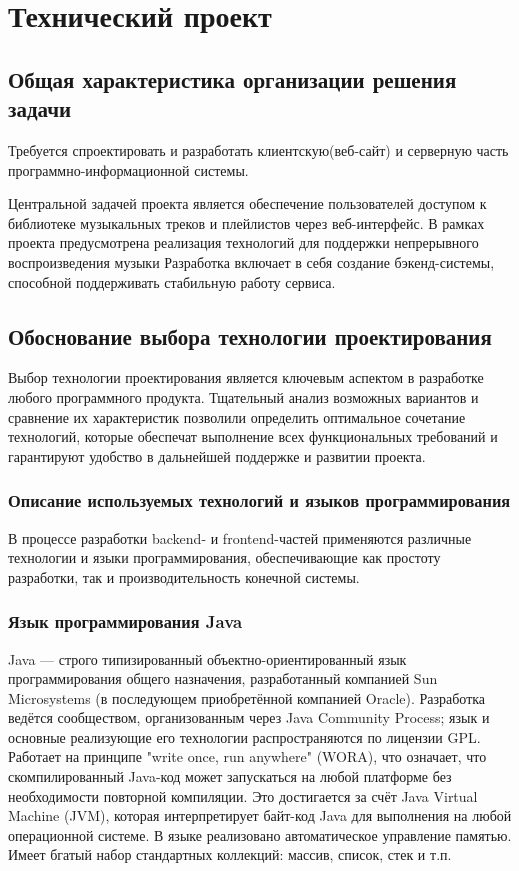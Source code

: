 \section{Технический проект}
\subsection{Общая характеристика организации решения задачи}

Требуется спроектировать и разработать клиентскую(веб-сайт) и серверную часть программно-информационной системы.

Центральной задачей проекта является обеспечение пользователей доступом к библиотеке музыкальных треков и плейлистов через веб-интерфейс. 
В рамках проекта предусмотрена реализация технологий для поддержки непрерывного воспроизведения музыки  Разработка включает в себя создание бэкенд-системы, способной поддерживать стабильную работу сервиса.

\subsection{Обоснование выбора технологии проектирования}

Выбор технологии проектирования является ключевым аспектом в разработке любого программного продукта. Тщательный анализ возможных вариантов и сравнение их характеристик позволили определить оптимальное сочетание технологий, которые обеспечат выполнение всех функциональных требований и гарантируют удобство в дальнейшей поддержке и развитии проекта. 

\subsubsection{Описание используемых технологий и языков программирования}

В процессе разработки backend- и frontend-частей применяются различные технологии и языки программирования, обеспечивающие как простоту разработки, так и производительность конечной системы.

\subsubsection{Язык программирования Java}

Java — строго типизированный объектно-ориентированный язык программирования общего назначения, разработанный компанией Sun Microsystems (в последующем приобретённой компанией Oracle). Разработка ведётся сообществом, организованным через Java Community Process; язык и основные реализующие его технологии распространяются по лицензии GPL. Работает на принципе "write once, run anywhere" (WORA), что означает, что скомпилированный Java-код может запускаться на любой платформе без необходимости повторной компиляции. Это достигается за счёт Java Virtual Machine (JVM), которая интерпретирует байт-код Java для выполнения на любой операционной системе\cite{java}. 
В языке реализовано автоматическое управление памятью. Имеет бгатый набор стандартных коллекций: массив, список, стек и т.п.

